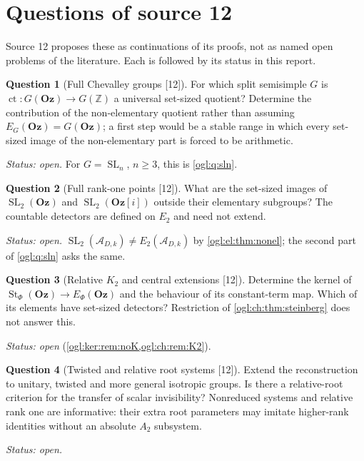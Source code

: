 \documentclass[11pt,oneside]{article}
\numberwithin{equation}{section}
\theoremstyle{definition}
\newtheorem{question}[question]{Question}
\theoremstyle{remark}
\newcommand{\Oz}{\mathbf{Oz}}
\newcommand{\GOz}{\mathbf{Oz}[i]}
\newcommand{\Z}{\mathbb Z}
\newcommand{\A}{\mathcal A}
\newcommand{\ct}{\operatorname{ct}}
\newcommand{\SL}{\operatorname{SL}}
\newcommand{\St}{\operatorname{St}}
\newcommand{\src}[1]{\textup{\textsf{\small[#1]}}}
\begin{document}
\section{Questions of source 12}\label{ogl:ch:sec:questions}

Source 12 proposes these as continuations of its proofs, not as named open
problems of the literature. Each is followed by its status in this report.

\begin{question}[Full Chevalley groups \src{12}]\label{ogl:ch:q:full}
For which split semisimple $G$ is $\ct:G(\Oz)\to G(\Z)$ a universal set-sized
quotient? Determine the contribution of the non-elementary quotient rather than
assuming $E_G(\Oz)=G(\Oz)$; a first step would be a stable range in which every
set-sized image of the non-elementary part is forced to be arithmetic.
\end{question}
\emph{Status: open.} For $G=\SL_n$, $n\ge3$, this is \cref{ogl:q:sln}.

\begin{question}[Full rank-one points \src{12}]\label{ogl:ch:q:rankonepoints}
What are the set-sized images of $\SL_2(\Oz)$ and $\SL_2(\GOz)$ outside their
elementary subgroups? The countable detectors are defined on $E_2$ and need not
extend.
\end{question}
\emph{Status: open.} $\SL_2(\A_{D,k})\ne E_2(\A_{D,k})$ by \cref{ogl:el:thm:nonel};
the second part of \cref{ogl:q:sln} asks the same.

\begin{question}[Relative $K_2$ and central extensions \src{12}]\label{ogl:ch:q:K2}
Determine the kernel of $\St_\Phi(\Oz)\to E_\Phi(\Oz)$ and the behaviour of its
constant-term map. Which of its elements have set-sized detectors? Restriction of
\cref{ogl:ch:thm:steinberg} does not answer this.
\end{question}
\emph{Status: open} (\cref{ogl:ker:rem:noK,ogl:ch:rem:K2}).

\begin{question}[Twisted and relative root systems \src{12}]\label{ogl:ch:q:twisted}
Extend the reconstruction to unitary, twisted and more general isotropic
groups. Is there a relative-root criterion for the transfer of scalar
invisibility? Nonreduced systems and relative rank one are informative: their
extra root parameters may imitate higher-rank identities without an absolute
$A_2$ subsystem.
\end{question}
\emph{Status: open.}
\end{document}
